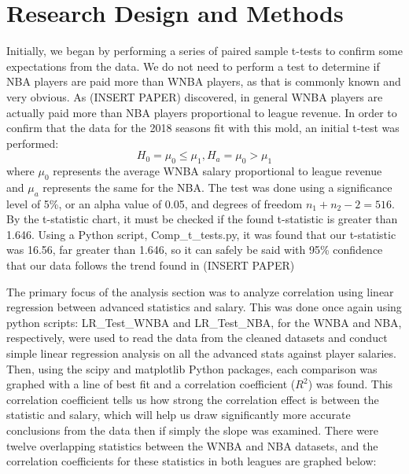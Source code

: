 \documentclass[12pt]{article}
\begin{document}
\section{Research Design and Methods}
Initially, we began by performing a series of paired sample t-tests to confirm some expectations from the data. We do not need to perform a test to determine if NBA players are paid more than WNBA players, as that is commonly known and very obvious. As (INSERT PAPER) discovered, in general WNBA players are actually paid more than NBA players proportional to league revenue. In order to confirm that the data for the 2018 seasons fit with this mold, an initial t-test was performed:
$$H_0 = \mu_0 \leq \mu_1, H_a = \mu_0 > \mu_1$$
where $\mu_0$ represents the average WNBA salary proportional to league revenue and $\mu_a$ represents the same for the NBA. The test was done using a significance level of  5\%, or an alpha value of 0.05, and degrees of freedom $n_1 + n_2 - 2 = 516$. By the t-statistic chart, it must be checked if the found t-statistic is greater than 1.646. Using a Python script, Comp\_t\_tests.py, it was found that our t-statistic was 16.56, far greater than 1.646, so it can safely be said with 95\% confidence that our data follows the trend found in (INSERT PAPER)
\par
The primary focus of the analysis section was to analyze correlation using linear regression between advanced statistics and salary. This was done once again using python scripts: LR\_Test\_WNBA and LR\_Test\_NBA, for the WNBA and NBA, respectively, were used to read the data from the cleaned datasets and conduct simple linear regression analysis on all the advanced stats against player salaries. Then, using the scipy and matplotlib Python packages, each comparison was graphed with a line of best fit and a correlation coefficient ($R^2$) was found. This correlation coefficient tells us how strong the correlation effect is between the statistic and salary, which will help us draw significantly more accurate conclusions from the data then if simply the slope was examined. There were twelve overlapping statistics between the WNBA and NBA datasets, and the correlation coefficients for these statistics in both leagues are graphed below:
\end{document}
